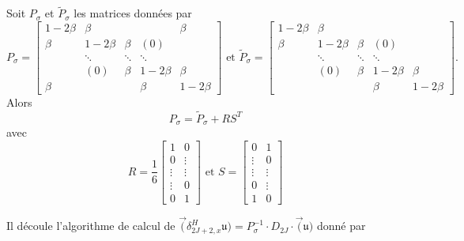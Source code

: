 \begin{proposition}
Soit $P_{\sigma}$ et $\tilde{P}_{\sigma}$ les matrices données par 
\begin{equation}
P_{\sigma} = \begin{bmatrix}
  1 - 2 \beta & \beta &   &   & \beta \\ 
  \beta & 1 - 2 \beta & \beta & (0) &   \\ 
    & \ddots & \ddots & \ddots &   \\ 
    & (0) & \beta & 1 - 2 \beta & \beta \\ 
  \beta &   &   & \beta & 1 - 2 \beta
  \end{bmatrix}  \text{ et }
\tilde{P}_{\sigma} = 
\begin{bmatrix}
  1 - 2 \beta & \beta &   &   &  \\ 
  \beta & 1 - 2 \beta & \beta & (0) &   \\ 
    & \ddots & \ddots & \ddots &   \\ 
    & (0) & \beta & 1 - 2 \beta & \beta \\ 
   &   &   & \beta & 1 - 2 \beta
  \end{bmatrix} .
\end{equation}
Alors 
\begin{equation}
P_{\sigma} = \tilde{P}_{\sigma} + R S^T
\end{equation} 
avec 
\begin{equation}
R = \dfrac{1}{6}\begin{bmatrix}
1 & 0 \\ 
0 & \vdots \\ 
\vdots & \vdots \\ 
\vdots & 0 \\ 
0 & 1
\end{bmatrix} \text{ et } 
S = \begin{bmatrix}
0 & 1 \\ 
\vdots & 0 \\ 
\vdots & \vdots \\ 
0 & \vdots \\ 
1 & 0
\end{bmatrix} 
\end{equation}
\end{proposition}

Il découle l'algorithme de calcul de $\vec (\delta_{2J+2,x}^H \mathfrak{u}) = P^{-1}_{\sigma} \cdot D_{2J} \cdot \vec (\mathfrak{u})$ donné par


